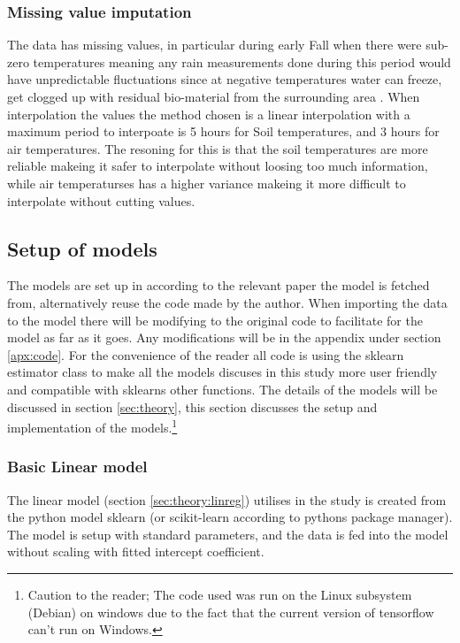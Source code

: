 \subsubsection{Missing value imputation}

The data has missing values, in particular during early Fall when there were sub-zero temperatures meaning any rain measurements done during this period would have unpredictable fluctuations since at negative temperatures water can freeze, get clogged up with residual bio-material from the surrounding area . When interpolation the values the method chosen is a linear interpolation with a maximum period to interpoate is 5 hours for Soil temperatures, and 3 hours for air temperatures. The resoning for this is that the soil temperatures are more reliable makeing it safer to interpolate without loosing too much information, while air temperaturses has a higher variance makeing it more difficult to interpolate without cutting values.

\subsection{Setup of models}

The models are set up in according to the relevant paper the model is fetched from, alternatively reuse the code made by the author. When importing the data to the model there will be modifying to the original code to facilitate for the model as far as it goes. Any modifications will be in the appendix under section \ref{apx:code}. For the convenience of the reader all code is using the sklearn estimator class to make all the models discuses in this study more user friendly and compatible with sklearns other functions. The details of the models will be discussed in section \ref{sec:theory}, this section discusses the setup and implementation of the models.\footnote{Caution to the reader; The code used was run on the Linux subsystem (Debian) on windows due to the fact that the current version of tensorflow can't run on Windows.}

\subsubsection{Basic Linear model}

The linear model (section \ref{sec:theory:linreg}) utilises in the study is created from the python model sklearn (or scikit-learn according to pythons package manager). The model is setup with standard parameters, and the data is fed into the model without scaling with fitted intercept coefficient. 

